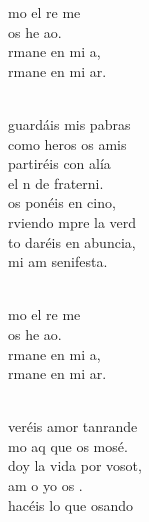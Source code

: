 \documentclass[12pt]{article}
\begin{document}
\begin{multicols*}{2}
\begin{cancion}[Amaos][Kairoi]%
	\begin{chorus}%
	mo el re me  \\
	 os he ao.\\
	rmane en mi a,\\
	rmane en mi ar.\\
	\end{chorus}%
	\jump\\
	guardáis mis pabras\\
	como heros os amis\\
	partiréis con alía\\
	el n de fraterni.\\
\jump
	os ponéis en cino,\\
	rviendo mpre la verd\\
	to daréis en abuncia,\\
	mi am senifesta.\\\jump\\
	\begin{chorus}%
	mo el re me  \\
	 os he ao.\\
	rmane en mi a,\\
	rmane en mi ar.\\
	\end{chorus}%
	\jump\\
	veréis amor tanrande\\
	mo aq que os mosé.\\
	doy la vida por vosot,\\
	am o yo os . \\
\jump
	hacéis lo que osando\\

\end{cancion}
\end{multicols*}
\end{document}
